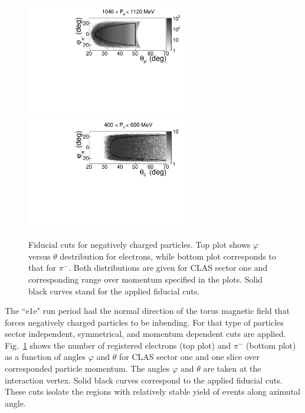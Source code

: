 \documentclass[prc,twocolumn,superscriptaddress,showpacs,amssymb,amsmath,amsfonts,linenumbers,aps]{revtex4-1}
\begin{document}
\begin{figure}[htp]
\begin{center}
\includegraphics[width=7cm,keepaspectratio]{pictures/fiducial_cuts/electrons.pdf}
\includegraphics[width=7cm,keepaspectratio]{pictures/fiducial_cuts/pim.pdf} 
\vspace{-0.1cm}
\caption{Fiducial cuts for negatively charged particles. Top plot shows $\varphi$ versus $\theta$ destribution for electrons, while bottom plot corresponds to that for $\pi^{-}$. Both distributions are given for CLAS sector one and corresponding range over momentum specified in the plots.  Solid black curves stand for the applied fiducial cuts. }
\label{fig:fid_cuts_neg}
\end{center}
\end{figure} 

The ``e1e" run period had  the normal direction of the torus magnetic field that forces negatively charged particles to be inbending. For that type of particles sector independent, symmetrical, and momentum dependent cuts are applied. 
Fig.~\ref{fig:fid_cuts_neg} shows the number of registered electrons (top plot) and $\pi^{-}$ (bottom plot) as a function of angles $\varphi$ and $\theta$  for CLAS sector one and one slice over corresponded particle momentum. The angles $\varphi$ and $\theta$ are taken at the interaction vertex. Solid black curves correspond to the applied fiducial cuts. These cuts isolate the regions with relatively stable yield of events along azimutal angle. 
\end{document}
